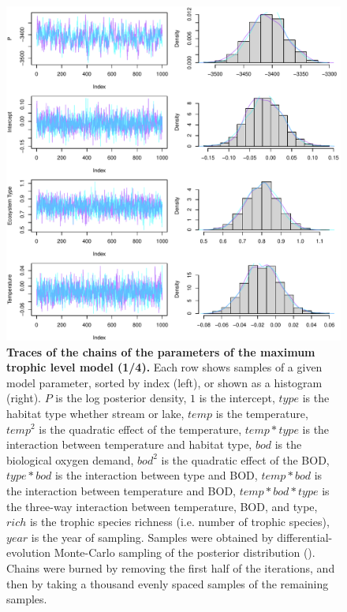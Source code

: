 \documentclass[11pt, oneside]{article}
\begin{document}
\begin{figure}[H]
\begin{center}
\includegraphics[page=1, width=1\linewidth]{scripts/b0_6_4/out_mTL/fig_tracePlot_beta.pdf}
\caption{
    \textbf{Traces of the chains of the parameters of the maximum trophic level model (1/4).}
    Each row shows samples of a given model parameter, sorted by index (left), or shown as a histogram (right).
    $P$ is the log posterior density, $1$ is the intercept, $type$ is the habitat type whether stream or lake, $temp$ is the temperature, $temp^2$ is the quadratic effect of the temperature, $temp * type$ is the interaction between temperature and habitat type, $bod$ is the biological oxygen demand, $bod^2$ is the quadratic effect of the BOD, $type * bod$ is the interaction between type and BOD, $temp * bod$ is the interaction between temperature and BOD, $temp * bod * type$ is the three-way interaction between temperature, BOD, and type, $rich$ is the trophic species richness (i.e. number of trophic species), $year$ is the year of sampling.
    Samples were obtained by differential-evolution Monte-Carlo sampling of the posterior distribution (\cite{TerBraak2006}).
    Chains were burned by removing the first half of the iterations, and then by taking a thousand evenly spaced samples of the remaining samples.
} 
\end{center}
\end{figure}
\end{document}
